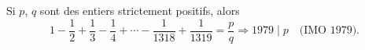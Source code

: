 Si $p$, $q$ sont des entiers strictement positifs, alors
\[ 1 - \frac{1}{2} + \frac{1}{3} - \frac{1}{4} + \cdots - \frac{1}{1318} + \frac{1}{1319} = \frac{p}{q} \Longrightarrow 1979 \mid p \quad \text{(IMO 1979).} \]
